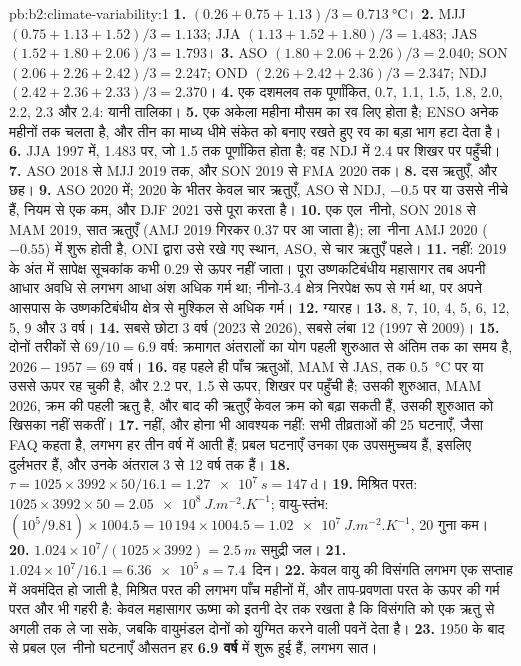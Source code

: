 \begin{solution}{pb:b2:climate-variability:1}
\textbf{1.} $(0.26 + 0.75 + 1.13)/3 = \qty{0.713}{\celsius}$।
\textbf{2.} MJJ $(0.75 + 1.13 + 1.52)/3 = 1.133$; JJA $(1.13 + 1.52 + 1.80)/3 = 1.483$; JAS $(1.52 +
1.80 + 2.06)/3 = 1.793$।
\textbf{3.} ASO $(1.80 + 2.06 + 2.26)/3 = 2.040$; SON $(2.06 + 2.26 + 2.42)/3 = 2.247$; OND $(2.26
+ 2.42 + 2.36)/3 = 2.347$; NDJ $(2.42 + 2.36 + 2.33)/3 = 2.370$।
\textbf{4.} एक दशमलव तक पूर्णांकित, 0.7, 1.1, 1.5, 1.8, 2.0, 2.2, 2.3 और 2.4: यानी तालिका।
\textbf{5.} एक अकेला महीना मौसम का रव लिए होता है; ENSO अनेक महीनों तक चलता है, और तीन का माध्य
धीमे संकेत को बनाए रखते हुए रव का बड़ा भाग हटा देता है।
\textbf{6.} JJA 1997 में, 1.483 पर, जो 1.5 तक पूर्णांकित होता है; वह NDJ में 2.4 पर शिखर पर पहुँची।
\textbf{7.} ASO 2018 से MJJ 2019 तक, और SON 2019 से FMA 2020 तक।
\textbf{8.} दस ऋतुएँ, और छह।
\textbf{9.} ASO 2020 में; 2020 के भीतर केवल चार ऋतुएँ, ASO से NDJ, $-0.5$ पर या उससे नीचे हैं, नियम से
एक कम, और DJF 2021 उसे पूरा करता है।
\textbf{10.} एक एल~नीनो, SON 2018 से MAM 2019, सात ऋतुएँ (AMJ 2019 गिरकर 0.37 पर आ जाता है);
ला~नीना AMJ 2020 ($-0.55$) में शुरू होती है, ONI द्वारा उसे रखे गए स्थान, ASO, से चार ऋतुएँ पहले।
\textbf{11.} नहीं: 2019 के अंत में सापेक्ष सूचकांक कभी 0.29 से ऊपर नहीं जाता। पूरा उष्णकटिबंधीय महासागर
तब अपनी आधार अवधि से लगभग आधा अंश अधिक गर्म था; नीनो-3.4 क्षेत्र
निरपेक्ष रूप से गर्म था, पर अपने आसपास के उष्णकटिबंधीय क्षेत्र से मुश्किल से अधिक गर्म।
\textbf{12.} ग्यारह।
\textbf{13.} 8, 7, 10, 4, 5, 6, 12, 5, 9 और 3 वर्ष।
\textbf{14.} सबसे छोटा 3 वर्ष (2023 से 2026), सबसे लंबा 12 (1997 से 2009)।
\textbf{15.} दोनों तरीकों से $69/10 = 6.9$ वर्ष: क्रमागत अंतरालों का योग पहली शुरुआत से
अंतिम तक का समय है, $2026 - 1957 = 69$ वर्ष।
\textbf{16.} वह पहले ही पाँच ऋतुओं, MAM से JAS, तक \qty{0.5}{\celsius} पर या उससे ऊपर रह चुकी है, और
2.2 पर, 1.5 से ऊपर, शिखर पर पहुँची है; उसकी शुरुआत, MAM 2026, क्रम की पहली ऋतु है, और बाद की ऋतुएँ
केवल क्रम को बढ़ा सकती हैं, उसकी शुरुआत को खिसका नहीं सकतीं।
\textbf{17.} नहीं, और होना भी आवश्यक नहीं: सभी तीव्रताओं की 25 घटनाएँ, जैसा FAQ कहता है, लगभग हर तीन वर्ष में आती हैं;
प्रबल घटनाएँ उनका एक उपसमुच्चय हैं, इसलिए दुर्लभतर हैं, और उनके अंतराल 3 से 12 वर्ष तक हैं।
\textbf{18.} $\tau = 1025 \times 3992 \times 50/16.1 = \qty{1.27e7}{s} = \qty{147}{\day}$।
\textbf{19.} मिश्रित परत: $1025 \times 3992 \times 50 = \qty{2.05e8}{J.m^{-2}.K^{-1}}$; वायु-स्तंभ:
$(10^5/9.81) \times 1004.5 = 10\,194 \times 1004.5 = \qty{1.02e7}{J.m^{-2}.K^{-1}}$, 20 गुना
कम।
\textbf{20.} $1.024 \times 10^7/(1025 \times 3992) = \qty{2.5}{m}$ समुद्री जल।
\textbf{21.} $1.024 \times 10^7/16.1 = \qty{6.36e5}{s} = 7.4$~दिन।
\textbf{22.} केवल वायु की विसंगति लगभग एक सप्ताह में अवमंदित हो जाती है, मिश्रित परत की लगभग
पाँच महीनों में, और ताप-प्रवणता परत के ऊपर की गर्म परत और भी गहरी है: केवल महासागर ऊष्मा को
इतनी देर तक रखता है कि विसंगति को एक ऋतु से अगली तक ले जा सके, जबकि वायुमंडल
दोनों को युग्मित करने वाली पवनें देता है।
\textbf{23.} 1950 के बाद से प्रबल एल~नीनो घटनाएँ औसतन हर \textbf{6.9 वर्ष} में शुरू हुई हैं,
लगभग सात।
\end{solution}
